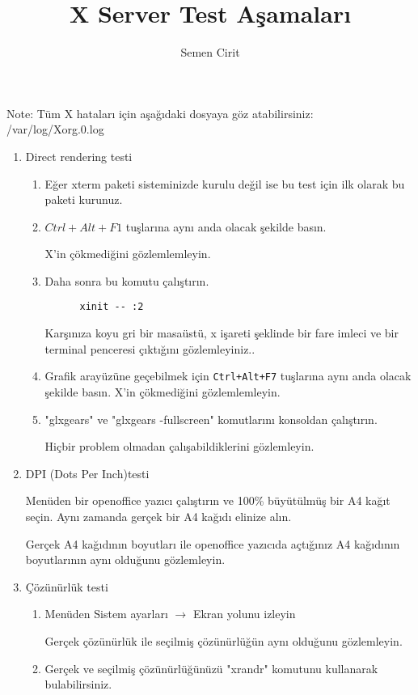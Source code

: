 \documentclass[a4paper,10pt]{article}
\title{X Server Test Aşamaları}
\author{Semen Cirit}
\begin{document}
\maketitle

 Note:	
  	Tüm X hataları için  aşağıdaki dosyaya göz atabilirsiniz:
	/var/log/Xorg.0.log  
\begin{enumerate}
  \item Direct rendering testi
    \begin{enumerate}
    \item Eğer xterm paketi sisteminizde kurulu değil ise bu test için ilk olarak bu paketi kurunuz.
    \item   $Ctrl+Alt+F1$ tuşlarına aynı anda olacak şekilde basın.

	    X'in çökmediğini gözlemlemleyin.
    \item  Daha sonra bu komutu çalıştırın.
	  \begin{verbatim}
	  xinit -- :2
	  \end{verbatim}
	  Karşınıza koyu gri bir masaüstü, x işareti şeklinde bir fare imleci ve bir terminal penceresi çıktığını gözlemleyiniz..
    \item Grafik arayüzüne geçebilmek için \texttt{Ctrl+Alt+F7} tuşlarına aynı anda olacak şekilde basın.    
	   X'in çökmediğini gözlemlemleyin.
    \item "glxgears" ve "glxgears -fullscreen" komutlarını konsoldan çalıştırın.

	  Hiçbir problem olmadan çalışabildiklerini gözlemleyin.
    \end{enumerate}

  \item DPI (Dots Per Inch)testi
    
        Menüden bir openoffice yazıcı çalıştırın ve 100\% büyütülmüş bir A4 kağıt seçin. Aynı zamanda gerçek bir A4 kağıdı elinize alın.

        Gerçek A4 kağıdının boyutları ile openoffice yazıcıda açtığınız A4 kağıdının boyutlarının aynı olduğunu gözlemleyin.
  \item Çözünürlük testi
     \begin{enumerate}
      \item Menüden Sistem ayarları $\rightarrow$ Ekran yolunu izleyin

	Gerçek çözünürlük ile seçilmiş çözünürlüğün aynı olduğunu gözlemleyin.

      \item Gerçek ve seçilmiş çözünürlüğünüzü "xrandr" komutunu kullanarak bulabilirsiniz.
	  

\end{enumerate}
\end{enumerate}
\end{document}
